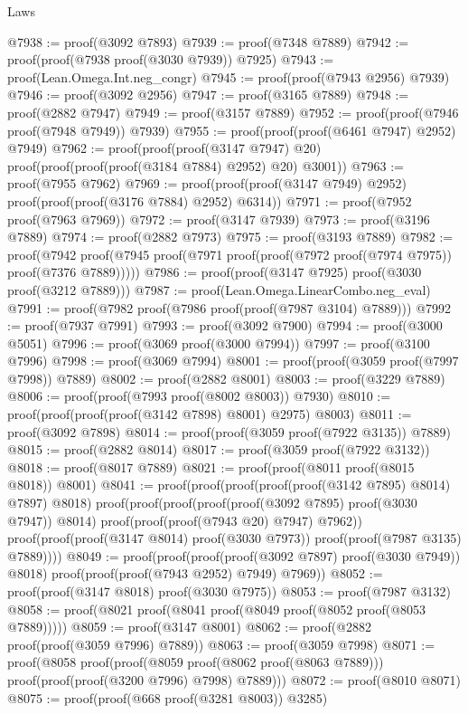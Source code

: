\begin{lexlean}{Laws}
\begin{coremodule}
@7938 := proof(@3092 @7893)
@7939 := proof(@7348 @7889)
@7942 := proof(proof(@7938 proof(@3030 @7939)) @7925)
@7943 := proof(Lean.Omega.Int.neg_congr)
@7945 := proof(proof(@7943 @2956) @7939)
@7946 := proof(@3092 @2956)
@7947 := proof(@3165 @7889)
@7948 := proof(@2882 @7947)
@7949 := proof(@3157 @7889)
@7952 := proof(proof(@7946 proof(@7948 @7949)) @7939)
@7955 := proof(proof(proof(@6461 @7947) @2952) @7949)
@7962 := proof(proof(proof(@3147 @7947) @20)
      proof(proof(proof(proof(@3184 @7884) @2952) @20) @3001))
@7963 := proof(@7955 @7962)
@7969 := proof(proof(proof(@3147 @7949) @2952) proof(proof(proof(@3176 @7884) @2952) @6314))
@7971 := proof(@7952 proof(@7963 @7969))
@7972 := proof(@3147 @7939)
@7973 := proof(@3196 @7889)
@7974 := proof(@2882 @7973)
@7975 := proof(@3193 @7889)
@7982 := proof(@7942
      proof(@7945 proof(@7971 proof(proof(@7972 proof(@7974 @7975)) proof(@7376 @7889)))))
@7986 := proof(proof(@3147 @7925) proof(@3030 proof(@3212 @7889)))
@7987 := proof(Lean.Omega.LinearCombo.neg_eval)
@7991 := proof(@7982 proof(@7986 proof(proof(@7987 @3104) @7889)))
@7992 := proof(@7937 @7991)
@7993 := proof(@3092 @7900)
@7994 := proof(@3000 @5051)
@7996 := proof(@3069 proof(@3000 @7994))
@7997 := proof(@3100 @7996)
@7998 := proof(@3069 @7994)
@8001 := proof(proof(@3059 proof(@7997 @7998)) @7889)
@8002 := proof(@2882 @8001)
@8003 := proof(@3229 @7889)
@8006 := proof(proof(@7993 proof(@8002 @8003)) @7930)
@8010 := proof(proof(proof(proof(@3142 @7898) @8001) @2975) @8003)
@8011 := proof(@3092 @7898)
@8014 := proof(proof(@3059 proof(@7922 @3135)) @7889)
@8015 := proof(@2882 @8014)
@8017 := proof(@3059 proof(@7922 @3132))
@8018 := proof(@8017 @7889)
@8021 := proof(proof(@8011 proof(@8015 @8018)) @8001)
@8041 := proof(proof(proof(proof(proof(@3142 @7895) @8014) @7897) @8018)
      proof(proof(proof(proof(proof(@3092 @7895) proof(@3030 @7947)) @8014)
            proof(proof(proof(@7943 @20) @7947) @7962))
          proof(proof(proof(@3147 @8014) proof(@3030 @7973)) proof(proof(@7987 @3135) @7889))))
@8049 := proof(proof(proof(proof(@3092 @7897) proof(@3030 @7949)) @8018)
      proof(proof(proof(@7943 @2952) @7949) @7969))
@8052 := proof(proof(@3147 @8018) proof(@3030 @7975))
@8053 := proof(@7987 @3132)
@8058 := proof(@8021 proof(@8041 proof(@8049 proof(@8052 proof(@8053 @7889)))))
@8059 := proof(@3147 @8001)
@8062 := proof(@2882 proof(proof(@3059 @7996) @7889))
@8063 := proof(@3059 @7998)
@8071 := proof(@8058
      proof(proof(@8059 proof(@8062 proof(@8063 @7889)))
          proof(proof(proof(@3200 @7996) @7998) @7889)))
@8072 := proof(@8010 @8071)
@8075 := proof(proof(@668 proof(@3281 @8003)) @3285)

\end{coremodule}
\end{lexlean}
